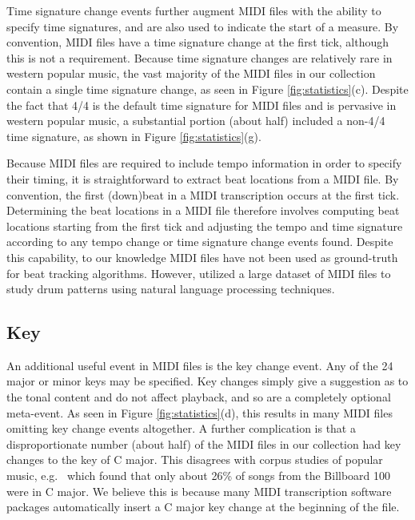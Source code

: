 \documentclass{article}
\begin{document}
Time signature change events further augment MIDI files with the ability to specify time signatures, and are also used to indicate the start of a measure.
By convention, MIDI files have a time signature change at the first tick, although this is not a requirement.
Because time signature changes are relatively rare in western popular music, the vast majority of the MIDI files in our collection contain a single time signature change, as seen in Figure \ref{fig:statistics}(c).
Despite the fact that 4/4 is the default time signature for MIDI files and is pervasive in western popular music, a substantial portion (about half) included a non-4/4 time signature, as shown in Figure \ref{fig:statistics}(g).

Because MIDI files are required to include tempo information in order to specify their timing, it is straightforward to extract beat locations from a MIDI file.
By convention, the first (down)beat in a MIDI transcription occurs at the first tick.
Determining the beat locations in a MIDI file therefore involves computing beat locations starting from the first tick and adjusting the tempo and time signature according to any tempo change or time signature change events found.
Despite this capability, to our knowledge MIDI files have not been used as ground-truth for beat tracking algorithms.  %
However, \cite{mauch2012corpus} utilized a large dataset of MIDI files to study drum patterns using natural language processing techniques.


\subsection{Key}
\label{sec:key}

An additional useful event in MIDI files is the key change event.
Any of the 24 major or minor keys may be specified.
Key changes simply give a suggestion as to the tonal content and do not affect playback, and so are a completely optional meta-event.
As seen in Figure \ref{fig:statistics}(d), this results in many MIDI files omitting key change events altogether.
A further complication is that a disproportionate number (about half) of the MIDI files in our collection had key changes to the key of C major.
This disagrees with corpus studies of popular music, e.g.\ \cite{carlton2012analyzed} which found that only about 26\% of songs from the Billboard 100 were in C major.
We believe this is because many MIDI transcription software packages automatically insert a C major key change at the beginning of the file.
\end{document}
